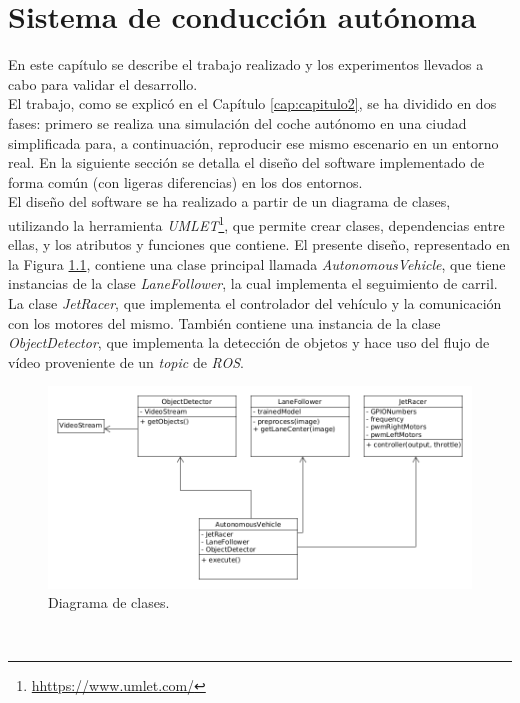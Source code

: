 \chapter{Sistema de conducción autónoma}
\label{cap:capitulo4}
En este capítulo se describe el trabajo realizado y los experimentos llevados a cabo para validar el desarrollo.\\

El trabajo, como se explicó en el Capítulo \ref{cap:capitulo2}, se ha dividido en dos fases: primero se realiza una simulación del coche autónomo en una ciudad simplificada para, a continuación, reproducir ese mismo escenario en un entorno real. En la siguiente sección se detalla el diseño del software implementado de forma común (con ligeras diferencias) en los dos entornos.\\

El diseño del software se ha realizado a partir de un diagrama de clases, utilizando la herramienta \textit{UMLET}\footnote{\url{hhttps://www.umlet.com/}}, que permite crear clases, dependencias entre ellas, y los atributos y funciones que contiene. El presente diseño, representado en la Figura \ref{fig:diagram}, contiene una clase principal llamada \textit{AutonomousVehicle}, que tiene instancias de la clase \textit{LaneFollower}, la cual implementa el seguimiento de carril. La clase \textit{JetRacer}, que implementa el controlador del vehículo y la comunicación con los motores del mismo. También contiene una instancia de la clase \textit{ObjectDetector}, que implementa la detección de objetos y hace uso del flujo de vídeo proveniente de un \textit{topic} de \textit{ROS}.
\begin{figure} [h!]
	\begin{center}
		\includegraphics[width=16cm]{figs/diagram6}
	\end{center}
	\caption{Diagrama de clases.}
	\label{fig:diagram}
\end{figure}\

